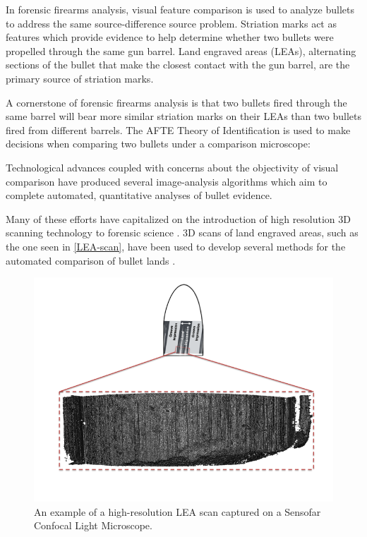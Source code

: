 \documentclass[12pt]{article}
\begin{document}
In forensic firearms analysis, visual feature comparison is used to
analyze bullets to address the same source-difference source problem.
Striation marks act as features which provide evidence to help determine
whether two bullets were propelled through the same gun barrel. Land
engraved areas (LEAs), alternating sections of the bullet that make the
closest contact with the gun barrel, are the primary source of striation
marks.

A cornerstone of forensic firearms analysis is that two bullets fired
through the same barrel will bear more similar striation marks on their
LEAs than two bullets fired from different barrels. The AFTE Theory of
Identification \citep{AFTE} is used to make decisions when comparing two
bullets under a comparison microscope:

Technological advances coupled with concerns about the objectivity of
visual comparison have produced several image-analysis algorithms which
aim to complete automated, quantitative analyses of bullet evidence.

Many of these efforts have capitalized on the introduction of high
resolution 3D scanning technology to forensic science
\citep[see][]{DeKinder1, DeKinder2, Bachrach1}. 3D scans of land
engraved areas, such as the one seen in \autoref{LEA-scan}, have been
used to develop several methods for the automated comparison of bullet
lands \citep[e.g.][]{Ma1, Chu1, Chu2, Hare1}.

\begin{figure}
\includegraphics[width=\textwidth]{../images/3d_plot_top_context_breakoff.png}
\caption{An example of a high-resolution LEA scan captured on a Sensofar Confocal Light Microscope.}
\label{LEA-scan}
\end{figure}
\end{document}
